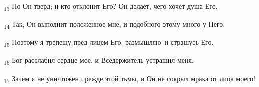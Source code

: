 \begin{tcolorbox}
\textsubscript{13} Но Он тверд; и кто отклонит Его? Он делает, чего хочет душа Его.
\end{tcolorbox}
\begin{tcolorbox}
\textsubscript{14} Так, Он выполнит положенное мне, и подобного этому много у Него.
\end{tcolorbox}
\begin{tcolorbox}
\textsubscript{15} Поэтому я трепещу пред лицем Его; размышляю--и страшусь Его.
\end{tcolorbox}
\begin{tcolorbox}
\textsubscript{16} Бог расслабил сердце мое, и Вседержитель устрашил меня.
\end{tcolorbox}
\begin{tcolorbox}
\textsubscript{17} Зачем я не уничтожен прежде этой тьмы, и Он не сокрыл мрака от лица моего!
\end{tcolorbox}
